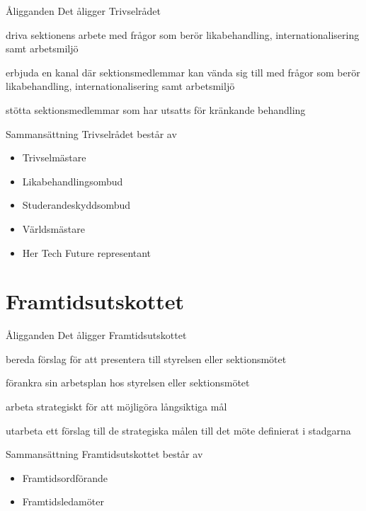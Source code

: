 \documentclass[pdfbookmarks,a4paper,11pt]{article}
\newlength{\itemcollength}
\newenvironment{reglemlista}{%
  \begin{list}{}{%
      \setlength{\labelwidth}{\itemcollength}%
      \setlength{\leftmargin}{\labelwidth + \labelsep}%
      \renewcommand{\makelabel}[1]{%
        \raisebox{0pt}[1ex][0pt]{%
          \makebox[\labelwidth][l]{%
            \parbox[t]{\itemcollength}{%
              \raggedright\hspace{0pt}##1}}}\hfill}%
      }}{%
  \end{list}}
\begin{document}
\begin{reglemlista}

	\item[Åligganden]
	Det åligger Trivselrådet
	\begin{attlista}
		\item driva sektionens arbete med frågor som berör likabehandling, internationalisering samt arbetsmiljö
		\item erbjuda en kanal där sektionsmedlemmar kan vända sig till med frågor som berör likabehandling, internationalisering samt arbetsmiljö
		\item stötta sektionsmedlemmar som har utsatts för kränkande behandling
	\end{attlista}
	\item[Sammansättning]
	Trivselrådet består av
	\begin{itemize}
		\item Trivselmästare
		\item Likabehandlingsombud
		\item Studerandeskyddsombud
		\item Världsmästare
		\item Her Tech Future representant
	\end{itemize}

\end{reglemlista}

\section{Framtidsutskottet}

\begin{reglemlista}

	\item[Åligganden]
	Det åligger Framtidsutskottet
	\begin{attlista}
		\item bereda förslag för att presentera till styrelsen eller sektionsmötet
		\item  förankra sin arbetsplan hos styrelsen eller sektionsmötet
		\item arbeta strategiskt för att möjligöra långsiktiga mål
		\item utarbeta ett förslag till de strategiska målen till det möte definierat i stadgarna
	\end{attlista}
	\item[Sammansättning]
	Framtidsutskottet består av
	\begin{itemize}
		\item Framtidsordförande
		\item Framtidsledamöter
	\end{itemize}

\end{reglemlista}
\end{document}
